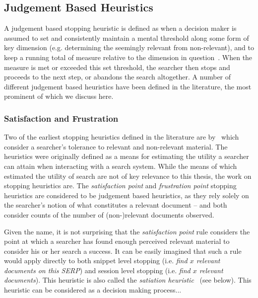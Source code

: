 \subsection{Judgement Based Heuristics}
A judgement based stopping heuristic is defined as when a decision maker is assumed to set and consistently maintain a mental threshold along some form of key dimension (e.g. determining the seemingly relevant from non-relevant), and to keep a running total of measure relative to the dimension in question~\citep{gettys1979hypothesis, nickles1995judgment}. When the measure is met or exceeded this set threshold, the searcher then stops and proceeds to the next step, or abandons the search altogether. A number of different judgement based heuristics have been defined in the literature, the most prominent of which we discuss here.

\subsubsection{Satisfaction and Frustration}\label{sec:stopping_background:heuristics:judgement:satisfaction_frustration}
Two of the earliest stopping heuristics defined in the literature are by~\cite{cooper1973retrieval_effectiveness_ii} which consider a searcher's tolerance to relevant and non-relevant material. The heuristics were originally defined as a means for estimating the utility a searcher can attain when interacting with a search system. While the means of which~\cite{cooper1973retrieval_effectiveness_ii} estimated the utility of search are not of key relevance to this thesis, the work on stopping heuristics are. The \emph{satisfaction point} and \emph{frustration point} stopping heuristics are considered to be judgement based heuristics, as they rely solely on the searcher's notion of what constitutes a relevant document -- and both consider counts of the number of (non-)relevant documents observed.

\noindent{}
Given the name, it is not surprising that the \emph{satisfaction point} rule considers the point at which a searcher has found enough perceived relevant material to consider his or her search a success. It can be easily imagined that such a rule would apply directly to both snippet level stopping (i.e. \emph{find $x$ relevant documents on this SERP}) and session level stopping (i.e. \emph{find $x$ relevant documents}). This heuristic is also called the \emph{satiation heuristic}~\citep{simon1955satiation} (see below). This heuristic can be considered as a decision making process...

